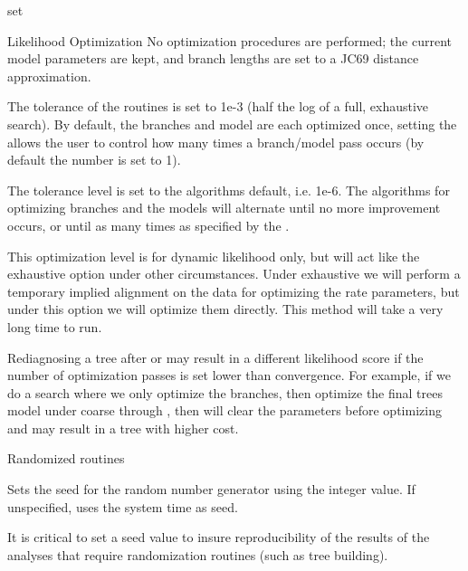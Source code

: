 \begin{command}{set}{}
\begin{arguments}
\begin{argumentgroup}{Likelihood Optimization}
{No optimization procedures are performed; the current model
parameters are kept, and branch lengths are set to a JC69
distance approximation.}
{}

{The tolerance of the routines is set to 1e-3 (half the
log of a full, exhaustive search). By default, 
the branches and model are each optimized once, 
setting the \poyint allows the user to control how 
many times a branch/model pass occurs
(by default the number is set to 1).}
{}

{The tolerance level is set to the algorithms default, i.e. 1e-6. 
The algorithms for optimizing branches and the models 
will alternate until no more improvement occurs, or
until as many times as specified by the \poyint.}
{}

{This optimization level is for dynamic likelihood only, but will act like the
exhaustive option under other circumstances. Under exhaustive we will perform
a temporary implied alignment on the data for optimizing the rate parameters,
but under this option we will optimize them directly. This method will take a very
long time to run.}
{}

\begin{statement}
Rediagnosing a tree after  or
 may result in a different likelihood score if
the number of optimization passes is set lower than convergence.
For example, if we do a search where we only optimize the
branches, then optimize the final trees model under coarse
through , then \poy will clear the
parameters before optimizing and may result in a tree with
higher cost.
\end{statement}

\end{argumentgroup}

\begin{argumentgroup}{Randomized routines}
{}

{Sets the seed for the random number generator using the integer 
value. If unspecified, \poy uses the system time as seed.}
{}
\begin{statement}
It is critical to set a seed value to insure reproducibility of
the results of the analyses that require randomization routines
(such as tree building).
\end{statement}


\end{argumentgroup}
\end{arguments}
\end{command}
